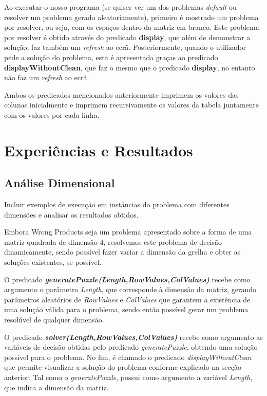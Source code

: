 \documentclass[11pt]{article}
\begin{document}
Ao executar o nosso programa (se quiser ver um dos problemas 
\textit{default} ou resolver um problema gerado aleatoriamente), primeiro é 
mostrado um problema por resolver, ou seja, com os espaços dentro da matriz em branco.
Este problema por resolver é obtido através do predicado \textbf{display}, que além
de demonstrar a solução, faz também um \textit{refresh} ao ecrã.
Posteriormente, quando o utilizador pede a solução do problema, esta é apresentada graças
ao predicado \textbf{displayWithoutClean}, que faz o mesmo que o predicado \textbf{display},
no entanto não faz um \textit{refresh} ao ecrã.

Ambos os predicados mencionados anteriormente imprimem os valores das colunas inicialmente
e imprimem recursivamente os valores da tabela juntamente com os valores por cada linha.

\section{Experiências e Resultados}

\subsection{Análise Dimensional} Incluir exemplos de execução em instâncias do problema com
diferentes dimensões e analisar os resultados obtidos.

Embora Wrong Products seja um problema apresentado sobre a forma de uma matriz quadrada de dimensão 4, resolvemos este problema de decisão dinamicamente, sendo possível fazer variar a dimensão da grelha e obter as soluções existentes, se possível.

O predicado \textbf{\emph{generatePuzzle(Length,RowValues,ColValues)}} recebe como argumento o parâmetro \emph{Length}, que corresponde à dimensão da matriz, gerando parâmetros aleatórios de \emph{RowValues} e \emph{ColValues} que garantem a existência de uma solução válida para o problema, sendo então possível gerar um problema resolúvel de qualquer dimensão.

O predicado \textbf{\emph{solver(Length,RowValues,ColValues)}} recebe como argumento as variáveis de decisão obtidas pelo predicado \emph{generatePuzzle}, obtendo uma solução possível para o problema. No fim, é chamado o predicado \emph{displayWithoutClean} que permite visualizar a solução do problema conforme explicado na secção anterior. Tal como o \emph{generatePuzzle}, possui como argumento a variável \emph{Length}, que indica a dimensão da matriz.
\end{document}
